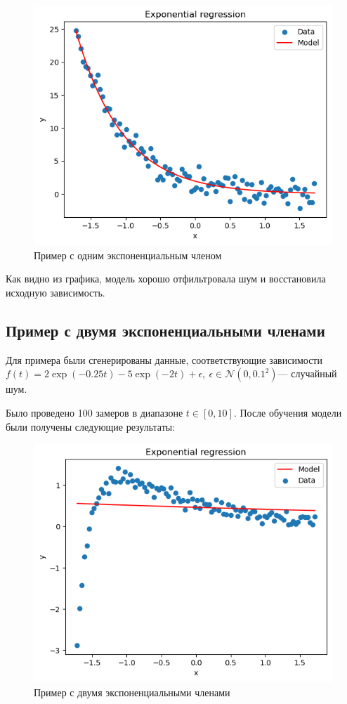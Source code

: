 \begin{figure}[h!]
	\centering
	\includegraphics[width=0.7\linewidth]{../img/ex1.png}
	\caption{Пример с одним экспоненциальным членом}
\end{figure}

Как видно из графика, модель хорошо отфильтровала шум и восстановила исходную зависимость.

\subsection{Пример с двумя экспоненциальными членами}

Для примера были сгенерированы данные, соответствующие зависимости $f(t) = 2\exp(-0.25t)-5\exp(-2t)  + \epsilon,\:\epsilon\in\mathcal{N}(0, 0.1^2)$— случайный шум.

Было проведено 100 замеров в диапазоне $t\in[0, 10]$. После обучения модели были получены следующие результаты:

\begin{figure}[h!]
	\centering
	\includegraphics[width=0.7\linewidth]{../img/ex2_poor.png}
	\caption{Пример с двумя экспоненциальными членами}
	\label{fig:image}
\end{figure}

